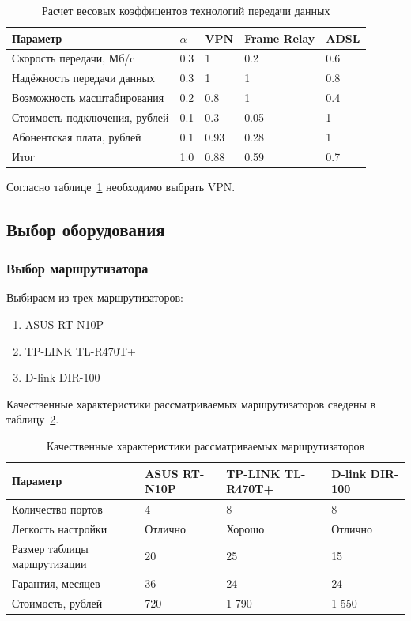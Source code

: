 \documentclass[russian,utf8,emptystyle]{eskdtext}
\begin{document}
\begin{longtable}{p{7cm}|p{1cm}|p{2cm}|p{2cm}|p{2cm}}
\caption{Расчет весовых коэффицентов технологий передачи данных}
\label{tab:connect-3} \\
Параметр & $\alpha$ & VPN & Frame Relay & ADSL \\ 
\hline 
Скорость передачи, Мб/c      & 0.3 & 1    & 0.2  & 0.6   \\ 
Надёжность передачи данных   & 0.3 & 1    & 1    & 0.8   \\ 
Возможность масштабирования  & 0.2 & 0.8  & 1    & 0.4   \\ 
Стоимость подключения, рублей& 0.1 & 0.3  & 0.05 & 1     \\ 
Абонентская плата, рублей    & 0.1 & 0.93 & 0.28 & 1     \\
\hline
Итог                         & 1.0 & 0.88 & 0.59 & 0.7
\end{longtable}

Согласно таблице~\ref{tab:connect-3} необходимо выбрать VPN. 

\clearpage
\subsection{Выбор оборудования}
\subsubsection{Выбор маршрутизатора}

Выбираем из трех маршрутизаторов:
\begin{enumerate}[label=\arabic*.]
\item ASUS RT-N10P
\item TP-LINK TL-R470T+
\item D-link DIR-100
\end{enumerate}

Качественные характеристики рассматриваемых маршрутизаторов сведены в таблицу~\ref{tab:routers-1}.

\begin{longtable}{p{7cm}|p{2cm}|p{2cm}|p{2cm}}
\caption{Качественные характеристики рассматриваемых маршрутизаторов}
\label{tab:routers-1} \\
Параметр                     & ASUS RT-N10P & TP-LINK TL-R470T+ & D-link DIR-100 \\ 
\hline 
Количество портов            & 4         & 8      & 8  \\ 
Легкость настройки           & Отлично   & Хорошо & Отлично  \\ 
Размер таблицы маршрутизации & 20        & 25     & 15  \\ 
Гарантия, месяцев            & 36        & 24     & 24  \\ 
Стоимость, рублей            & 720       & 1 790  & 1 550 \\
\end{longtable}
\end{document}
